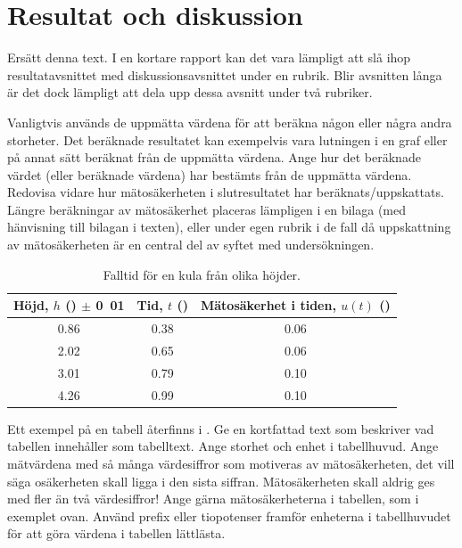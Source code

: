 \documentclass[a4paper,nologo]{miunart} %
\begin{document}
\section{Resultat och diskussion}
\label{sec:results}
\noindent
Ersätt denna text.
I en kortare rapport kan det vara lämpligt att slå ihop resultatavsnittet med 
diskussionsavsnittet under en rubrik.
Blir avsnitten långa är det dock lämpligt att dela upp dessa avsnitt under två 
rubriker.

Vanligtvis används de uppmätta värdena för att beräkna någon eller några andra 
storheter.
Det beräknade resultatet kan exempelvis vara lutningen i en graf eller på annat 
sätt beräknat från de uppmätta värdena.
Ange hur det beräknade värdet (eller beräknade värdena) har bestämts från de 
uppmätta värdena.
Redovisa vidare hur mätosäkerheten i slutresultatet har beräknats/uppskattats.
Längre beräkningar av mätosäkerhet placeras lämpligen i en bilaga (med 
hänvisning till bilagan i texten), eller under egen rubrik i de fall då 
uppskattning av mätosäkerheten är en central del av syftet med undersökningen.

\begin{table}
	\centering
	\begin{tabular}{ccc}
		\hline\hline
		\textbf{Höjd, \(h\) (\metre) \(\pm\) \unit{0.01}{\metre}} &
		\textbf{Tid, \(t\) (\second)} &
		\textbf{Mätosäkerhet i tiden, \(u(t)\) (\second)} \\
		\hline
		0.86 &	0.38 &	0.06 \\
		2.02 &	0.65 &	0.06 \\
		3.01 &	0.79 &	0.10 \\
		4.26 &	0.99 &	0.10 \\
		\hline\hline
	\end{tabular}
	\caption{Falltid för en kula från olika höjder.}
	\label{tab:kula}
\end{table}

Ett exempel på en tabell återfinns i .
Ge en kortfattad text som beskriver vad tabellen innehåller som tabelltext.
Ange storhet och enhet i tabellhuvud.
Ange mätvärdena med så många värdesiffror som motiveras av mätosäkerheten, det 
vill säga osäkerheten skall ligga i den sista siffran.
Mätosäkerheten skall aldrig ges med fler än två värdesiffror!
Ange gärna mätosäkerheterna i tabellen, som i exemplet ovan.
Använd prefix eller tiopotenser framför enheterna i tabellhuvudet för att göra 
värdena i tabellen lättlästa.
\end{document}
